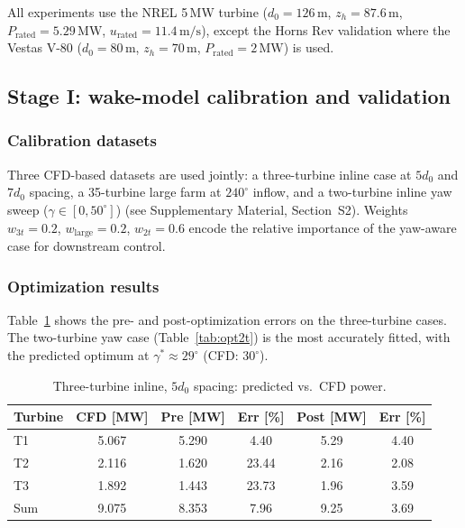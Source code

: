\documentclass[final,5p,times]{elsarticle}
\begin{document}
All experiments use the NREL 5\,MW turbine ($d_0=126\,\mathrm{m}$, $z_h=87.6\,\mathrm{m}$, $P_\mathrm{rated}=5.29\,\mathrm{MW}$, $u_\mathrm{rated}=11.4\,\mathrm{m/s}$), except the Horns Rev validation where the Vestas V-80 ($d_0=80\,\mathrm{m}$, $z_h=70\,\mathrm{m}$, $P_\mathrm{rated}=2\,\mathrm{MW}$) is used.

\subsection{Stage I: wake-model calibration and validation}

\subsubsection{Calibration datasets}
Three CFD-based datasets are used jointly: a three-turbine inline case at $5d_0$ and $7d_0$ spacing, a 35-turbine large farm at $240^\circ$ inflow, and a two-turbine inline yaw sweep ($\gamma\in[0,50^\circ]$) (see Supplementary Material, Section~S2). Weights $w_{3t}=0.2$, $w_\mathrm{large}=0.2$, $w_{2t}=0.6$ encode the relative importance of the yaw-aware case for downstream control.



\subsubsection{Optimization results}
Table~\ref{tab:opt3t} shows the pre- and post-optimization errors on the three-turbine cases. The two-turbine yaw case (Table~\ref{tab:opt2t}) is the most accurately fitted, with the predicted optimum at $\gamma^*\approx29^\circ$ (CFD: $30^\circ$).

\begin{table}[h]
\centering
\caption{Three-turbine inline, $5d_0$ spacing: predicted vs.\ CFD power.}
\label{tab:opt3t}
\small
\begin{tabular}{lccccc}
\toprule
Turbine & CFD [MW] & Pre [MW] & Err [\%] & Post [MW] & Err [\%] \\
\midrule
T1 & 5.067 & 5.290 & 4.40 & 5.29 & 4.40 \\
T2 & 2.116 & 1.620 & 23.44 & 2.16 & 2.08 \\
T3 & 1.892 & 1.443 & 23.73 & 1.96 & 3.59 \\
\midrule
Sum & 9.075 & 8.353 & 7.96 & 9.25 & 3.69 \\
\bottomrule
\end{tabular}
\end{table}
\end{document}
